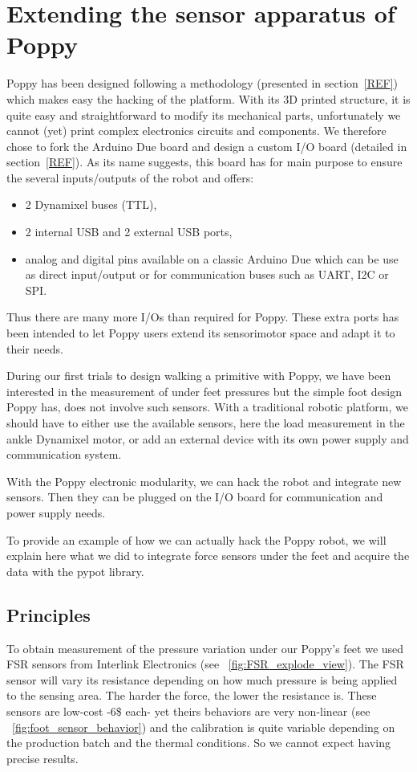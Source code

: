 
\newpage
\section{Extending the sensor apparatus of Poppy} %
\label{sec:morphology-adding-mechanism}


Poppy has been designed following a methodology (presented in section~\ref{REF}) which makes easy the hacking of the platform. With its 3D printed structure, it is quite easy and straightforward to modify its mechanical parts, unfortunately we cannot (yet) print complex electronics circuits and components. We therefore chose to fork the Arduino Due board and design a custom I/O board (detailed in section~\ref{REF}). As its name suggests, this board has for main purpose to ensure the several inputs/outputs of the robot and offers:
\begin{itemize}
    \item 2 Dynamixel buses (TTL),
    \item 2 internal USB and 2 external USB ports,
    \item analog and digital pins available on a classic Arduino Due which can be use as direct input/output or for communication buses such as UART, I2C or SPI.
\end{itemize}
Thus there are many more I/Os than required for Poppy. These extra ports has been intended to let Poppy users extend its sensorimotor space and adapt it to their needs.


During our first trials to design walking a primitive with Poppy, we have been interested in the measurement of under feet pressures but the simple foot design Poppy has, does not involve such sensors. With a traditional robotic platform, we should have to either use the available sensors, here the load measurement in the ankle Dynamixel motor, or add an external device with its own power supply and communication system.

With the Poppy electronic modularity, we can hack the robot and integrate new sensors. Then they can be plugged on the I/O board for communication and power supply needs.

To provide an example of how we can actually hack the Poppy robot, we will explain here what we did to integrate force sensors under the feet and acquire the data with the pypot library.

\subsection{Principles} %
To obtain measurement of the pressure variation under our Poppy's feet we used FSR sensors from Interlink Electronics (see \figurename~\ref{fig:FSR_explode_view}). The FSR sensor will vary its resistance depending on how much pressure is being applied to the sensing area. The harder the force, the lower the resistance is. These sensors are low-cost -6\$ each- yet theirs behaviors are very non-linear (see \figurename~\ref{fig:foot_sensor_behavior}) and the calibration is quite variable depending on the production batch and the thermal conditions. So we cannot expect having precise results.

